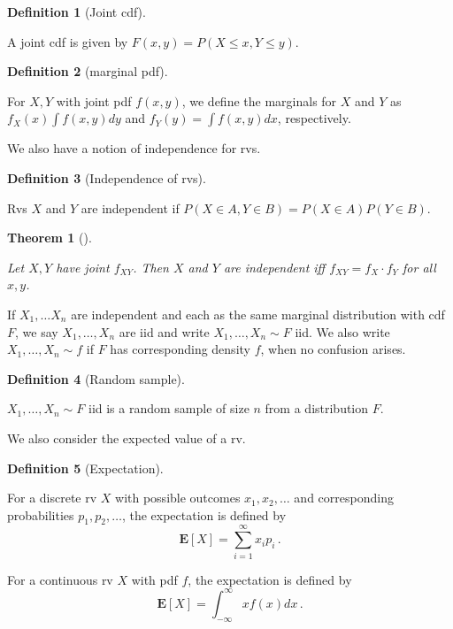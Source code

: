 \documentclass[
  a4paper,
  oneside]{book}
\theoremstyle{definition}
\newtheorem{definition}{Definition}[chapter]
\theoremstyle{definition}
\theoremstyle{definition}
\theoremstyle{plain}
\newtheorem{theorem}{Theorem}[chapter]
\theoremstyle{remark}
\begin{document}
\begin{definition}[Joint
cdf]\protect\hypertarget{def-joint-cdf}{}\label{def-joint-cdf}

A joint cdf is given by \(F(x,y) = P(X\leq x, Y\leq y)\).

\end{definition}

\begin{definition}[marginal
pdf]\protect\hypertarget{def-marginals}{}\label{def-marginals}

For \(X,Y\) with joint pdf \(f(x,y)\), we define the marginals for \(X\)
and \(Y\) as \(f_X(x) \int f(x,y) dy\) and \(f_Y(y) = \int f(x,y) dx\),
respectively.

\end{definition}

We also have a notion of independence for rvs.

\begin{definition}[Independence of
rvs]\protect\hypertarget{def-indep-rv}{}\label{def-indep-rv}

Rvs \(X\) and \(Y\) are independent if
\(P(X \in A, Y \in B) = P(X \in A) P(Y \in B)\).

\end{definition}

\begin{theorem}[]\protect\hypertarget{thm-pdf-indep-rv}{}\label{thm-pdf-indep-rv}

Let \(X,Y\) have joint \(f_{XY}\). Then \(X\) and \(Y\) are independent
iff \(f_{XY} = f_X \cdot f_Y\) for all \(x,y\).

\end{theorem}

If \(X_1, \dots X_n\) are independent and each as the same marginal
distribution with cdf \(F\), we say \(X_1, \dots, X_n\) are iid and
write \(X_1, \dots, X_n \sim F\) iid. We also write
\(X_1, \dots, X_n \sim f\) if \(F\) has corresponding density \(f\),
when no confusion arises.

\begin{definition}[Random
sample]\protect\hypertarget{def-sample}{}\label{def-sample}

\(X_1, \dots, X_n \sim F\) iid is a random sample of size \(n\) from a
distribution \(F\).

\end{definition}

We also consider the expected value of a rv.

\begin{definition}[Expectation]\protect\hypertarget{def-expected-value}{}\label{def-expected-value}

For a discrete rv \(X\) with possible outcomes \(x_1, x_2, \dots\) and
corresponding probabilities \(p_1, p_2, \dots\), the expectation is
defined by \[\mathbf{E}[X] = \sum_{i=1}^\infty x_i p_i\,.\]

For a continuous rv \(X\) with pdf \(f\), the expectation is defined by
\[\mathbf{E}[X] = \int_{-\infty}^{\infty} x f(x) dx\,.\]

\end{definition}
\end{document}
